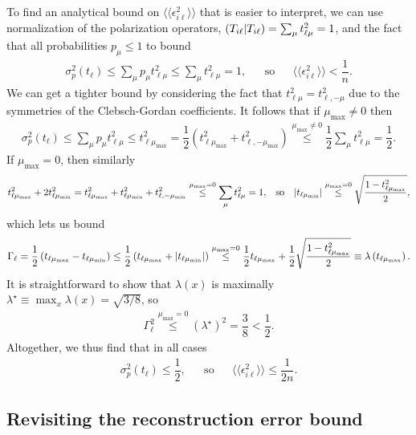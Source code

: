 \documentclass[a4paper,twocolumn,unpublished]{quantumarticle}
\renewcommand{\t}{\text} %
\newcommand{\f}[2]{\dfrac{#1}{#2}} %
\newcommand{\p}[1]{\left(#1\right)} %
\newcommand{\bbk}[1]{\langle\!\langle #1 \rangle\!\rangle}
\def\obk#1{\mathinner{({#1})}}
\begin{document}
To find an analytical bound on $\bbk{\epsilon_{i\ell}^2}$ that is easier to interpret, we can use normalization of the polarization operators, $\obk{T_{i\ell}|T_{i\ell}}=\sum_\mu t_{\ell\mu}^2 = 1$, and the fact that all probabilities $p_\mu\le1$ to bound
\begin{align}
  \sigma_p^2\p{t_\ell} \le \sum_\mu p_\mu t_{\ell\mu}^2
  \le \sum_\mu t_{\ell\mu}^2 = 1,
  &&
  \t{so}
  &&
  \bbk{\epsilon_{i\ell}^2} < \f1n.
\end{align}
We can get a tighter bound by considering the fact that $t_{\ell\mu}^2 = t_{\ell,-\mu}^2$ due to the symmetries of the Clebsch-Gordan coefficients.
It follows that if $\mu_{\t{max}}\ne0$ then
\begin{align}
  \sigma_p^2\p{t_\ell} \le \sum_\mu p_\mu t_{\ell\mu}^2
  \le t_{\ell\mu_{\t{max}}}^2
  = \f12 \p{t_{\ell\mu_{\t{max}}}^2 + t_{\ell,-\mu_{\t{max}}}^2}
  \stackrel{\mu_{\t{max}}\ne0}{\le} \f12 \sum_\mu t_{\ell\mu}^2
  = \f12.
\end{align}
If $\mu_{\t{max}}=0$, then similarly
\begin{align}
  t_{\ell\mu_{\t{max}}}^2 + 2 t_{\ell\mu_{\t{min}}}^2
  = t_{\ell\mu_{\t{max}}}^2 + t_{\ell\mu_{\t{min}}}^2
  + t_{\ell,-\mu_{\t{min}}}^2
  \stackrel{\mu_{\t{max}}=0}{\le}
  \sum_\mu t_{\ell\mu}^2 = 1,
  &&
  \t{so}
  &&
  \abs{t_{\ell\mu_{\t{min}}}}
  \stackrel{\mu_{\t{max}}=0}{\le}
  \sqrt{\f{1 - t_{\ell\mu_{\t{max}}}^2}{2}},
\end{align}
which lets us bound
\begin{align}
  \Gamma_\ell
  = \f12 \p{t_{\ell\mu_{\t{max}}} - t_{\ell\mu_{\t{min}}}}
  \le \f12 \p{t_{\ell\mu_{\t{max}}} + \abs{t_{\ell\mu_{\t{min}}}}}
  \stackrel{\mu_{\t{max}}=0}{\le}
  \f12 t_{\ell\mu_{\t{max}}}
  + \f12\sqrt{\f{1 - t_{\ell\mu_{\t{max}}}^2}{2}}
  \equiv \lambda\p{t_{\ell\mu_{\t{max}}}}.
\end{align}
It is straightforward to show that $\lambda\p{x}$ is maximally $\lambda^\star\equiv \max_x \lambda\p{x} = \sqrt{3/8}$, so
\begin{align}
  \Gamma_\ell^2
  \stackrel{\mu_{\t{max}}=0}{\le} \p{\lambda^\star}^2
  = \f38 < \f12.
\end{align}
Altogether, we thus find that in all cases
\begin{align}
  \sigma_p^2\p{t_\ell} \le \f12,
  &&
  \t{so}
  &&
  \bbk{\epsilon_{i\ell}^2} \le \f1{2n}.
\end{align}

\subsection{Revisiting the reconstruction error bound}
\label{sec:revisiting}
\end{document}
